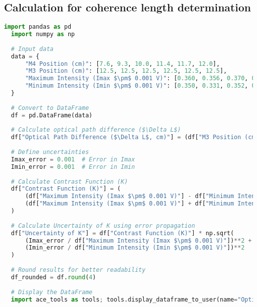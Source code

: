 \documentclass[a4paper,11pt]{article}
\begin{document}
\subsection{Calculation for coherence length determination}
\begin{lstlisting}[language=Python]
  import pandas as pd
  import numpy as np
  
  # Input data
  data = {
      "M4 Position (cm)": [7.6, 9.3, 10.0, 11.4, 11.7, 12.0],
      "M3 Position (cm)": [12.5, 12.5, 12.5, 12.5, 12.5, 12.5],
      "Maximum Intensity (Imax $\pm$ 0.001 V)": [0.360, 0.356, 0.370, 0.348, 0.360, 0.325],
      "Minimum Intensity (Imin $\pm$ 0.001 V)": [0.350, 0.331, 0.352, 0.308, 0.304, 0.260]
  }
  
  # Convert to DataFrame
  df = pd.DataFrame(data)
  
  # Calculate optical path difference ($\Delta L$)
  df["Optical Path Difference ($\Delta L$, cm)"] = (df["M3 Position (cm)"] - df["M4 Position (cm)"]) * 2
  
  # Define uncertainties
  Imax_error = 0.001  # Error in Imax
  Imin_error = 0.001  # Error in Imin
  
  # Calculate Contrast Function (K)
  df["Contrast Function (K)"] = (
      (df["Maximum Intensity (Imax $\pm$ 0.001 V)"] - df["Minimum Intensity (Imin $\pm$ 0.001 V)"]) /
      (df["Maximum Intensity (Imax $\pm$ 0.001 V)"] + df["Minimum Intensity (Imin $\pm$ 0.001 V)"])
  )
  
  # Calculate Uncertainty of K using error propagation
  df["Uncertainty of K"] = df["Contrast Function (K)"] * np.sqrt(
      (Imax_error / df["Maximum Intensity (Imax $\pm$ 0.001 V)"])**2 +
      (Imin_error / df["Minimum Intensity (Imin $\pm$ 0.001 V)"])**2
  )
  
  # Round results for better readability
  df_rounded = df.round(4)
  
  # Display the DataFrame
  import ace_tools as tools; tools.display_dataframe_to_user(name="Optical Path Difference and Contrast Analysis", dataframe=df_rounded)  
\end{lstlisting}
\label{code: Coherence Length Determination}
\end{document}
